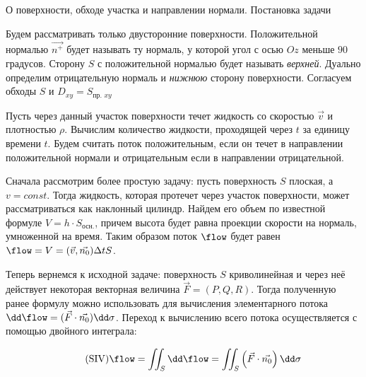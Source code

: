 
\begin{remark}
  О поверхности, обходе участка и направлении нормали. Постановка задачи

  \begin{twocolumns}
    
    \columnbreak

    Будем рассматривать только двусторонние поверхности. Положительной
    нормалью \(\vec{n^{+}}\) будет называть ту нормаль, у которой угол с осью
    \(Oz\) меньше \(90\) градусов. Сторону \(S\) с положительной нормалью
    будет называть \textit{верхней}. Дуально определим отрицательную нормаль и
    \textit{нижнюю} сторону поверхности. Согласуем обходы \(S\) и
    \(D_{xy} = S_{\text{пр. }xy}\)

    Пусть через данный участок поверхности течет жидкость со скоростью
    \(\vec{v}\) и плотностью \(\rho\). Вычислим количество жидкости, проходящей
    через \(t\) за единицу времени \(t\). Будем считать поток положительным,
    если он течет в направлении положительной нормали и отрицательным если в 
    направлении отрицательной.

    \vfill\null
  \end{twocolumns}
\end{remark}

Сначала рассмотрим более простую задачу: пусть поверхность \(S\) плоская, а
\(v = const\). Тогда жидкость, которая протечет через участок поверхности, может
рассматриваться как наклонный цилиндр. Найдем его объем по известной формуле
\(V = h \cdot S_{\text{осн.}}\), причем высота будет равна проекции скорости на
нормаль, умноженной на время. Таким образом поток \(\flow\) будет равен
\(\flow = V = (\vec{v}, \vec{n_{0}}) \Delta t S\).

Теперь вернемся к исходной задаче: поверхность \(S\) криволинейная и через неё
действует некоторая векторная величина \(\vec{F} = (P, Q, R)\). Тогда полученную
ранее формулу можно использовать для вычисления элементарного потока
\(\dd \flow = (\vec{F} \cdot \vec{n_{0}}) \dd \sigma\). Переход к вычислению
всего потока осуществляется с помощью двойного интеграла:

\begin{align*}\label{eq:surf-int-vec}\tag{SIV}
  \flow
  = \iint_{S} \dd \flow
  = \iint_{S} \left( \vec{F} \cdot \vec{n_{0}} \right) \dd \sigma 
\end{align*}

